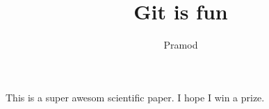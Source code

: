 \documentclass[10pt]{article}
\author{Pramod}
\title{Git is fun}
\begin{document}
	\maketitle
	This is a super awesom scientific paper.
	I hope I win a prize.
\end{document}
